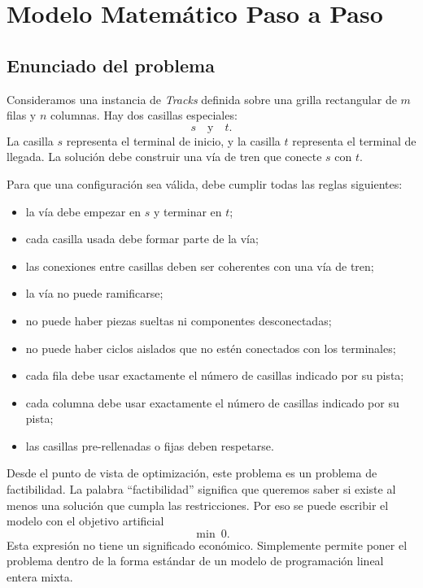 \section{Modelo Matemático Paso a Paso}
\label{sec:modelo-matematico-paso-a-paso}

\subsection{Enunciado del problema}

Consideramos una instancia de \emph{Tracks} definida sobre una grilla rectangular de \(m\) filas y \(n\) columnas. Hay dos casillas especiales:
\[
    s \quad \text{y} \quad t.
\]
La casilla \(s\) representa el terminal de inicio, y la casilla \(t\) representa el terminal de llegada. La solución debe construir una vía de tren que conecte \(s\) con \(t\).

Para que una configuración sea válida, debe cumplir todas las reglas siguientes:
\begin{itemize}[leftmargin=2em]
    \item la vía debe empezar en \(s\) y terminar en \(t\);
    \item cada casilla usada debe formar parte de la vía;
    \item las conexiones entre casillas deben ser coherentes con una vía de tren;
    \item la vía no puede ramificarse;
    \item no puede haber piezas sueltas ni componentes desconectadas;
    \item no puede haber ciclos aislados que no estén conectados con los terminales;
    \item cada fila debe usar exactamente el número de casillas indicado por su pista;
    \item cada columna debe usar exactamente el número de casillas indicado por su pista;
    \item las casillas pre-rellenadas o fijas deben respetarse.
\end{itemize}

Desde el punto de vista de optimización, este problema es un problema de factibilidad. La palabra ``factibilidad'' significa que queremos saber si existe al menos una solución que cumpla las restricciones. Por eso se puede escribir el modelo con el objetivo artificial
\[
    \min \ 0.
\]
Esta expresión no tiene un significado económico. Simplemente permite poner el problema dentro de la forma estándar de un modelo de programación lineal entera mixta.

